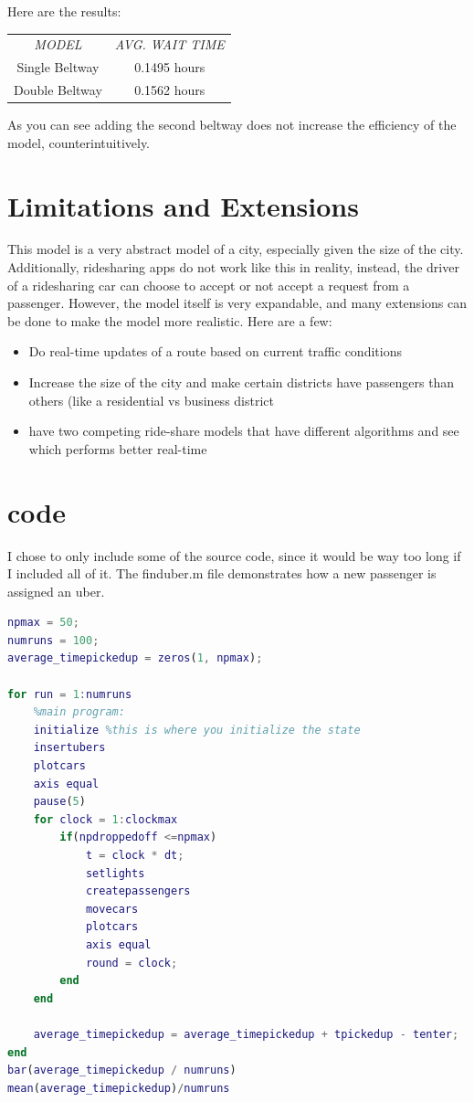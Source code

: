 \documentclass{article}
\begin{document}
Here are the results:
\begin{center}
\begin{tabular}{ |c|c| } 
 \hline
 \textit{MODEL} & \textit{AVG. WAIT TIME}\\ 
 Single Beltway & 0.1495 hours\\ 
 Double Beltway & 0.1562 hours\\
 \hline
\end{tabular}
\end{center}

As you can see adding the second beltway does not increase the efficiency of the model, counterintuitively. 

\section{Limitations and Extensions}
This model is a very abstract model of a city, especially given the size of the city. Additionally, ridesharing apps do not work like this in reality, instead, the driver of a ridesharing car can choose to accept or not accept a request from a passenger. However, the model itself is very expandable, and many extensions can be done to make the model more realistic. Here are a few:
\begin{itemize}
	\item Do real-time updates of a route based on current traffic conditions
	\item Increase the size of the city and make certain districts have passengers than others (like a residential vs business district
	\item have two competing ride-share models that have different algorithms and see which performs better real-time
\end{itemize}

\section{code}
I chose to only include some of the source code, since it would be way too long if I included all of it. The finduber.m file demonstrates how a new passenger is assigned an uber.
\begin{lstlisting}[language = matlab]
%mainprogram: The script that runs the code
npmax = 50;
numruns = 100;
average_timepickedup = zeros(1, npmax);

for run = 1:numruns
    %main program:
    initialize %this is where you initialize the state
    insertubers
    plotcars
    axis equal
    pause(5)
    for clock = 1:clockmax
        if(npdroppedoff <=npmax)
            t = clock * dt;
            setlights
            createpassengers
            movecars
            plotcars
            axis equal
            round = clock;
        end
    end

    average_timepickedup = average_timepickedup + tpickedup - tenter;
end
bar(average_timepickedup / numruns)
mean(average_timepickedup)/numruns
\end{lstlisting}
\end{document}
